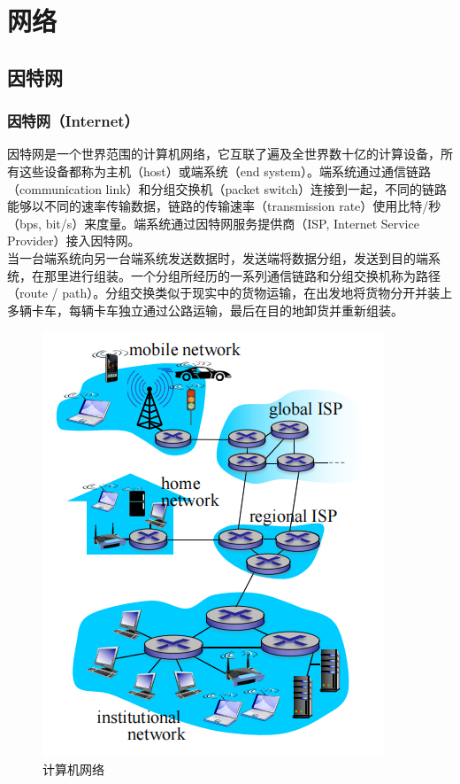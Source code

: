 \chapter{网络}

\section{因特网}

\subsection{因特网（Internet）}

因特网是一个世界范围的计算机网络，它互联了遍及全世界数十亿的计算设备，所有这些设备都称为主机（host）或端系统（end system）。端系统通过通信链路（communication link）和分组交换机（packet switch）连接到一起，不同的链路能够以不同的速率传输数据，链路的传输速率（transmission rate）使用比特/秒（bps, bit/s）来度量。端系统通过因特网服务提供商（ISP, Internet Service Provider）接入因特网。\\

当一台端系统向另一台端系统发送数据时，发送端将数据分组，发送到目的端系统，在那里进行组装。一个分组所经历的一系列通信链路和分组交换机称为路径（route / path）。分组交换类似于现实中的货物运输，在出发地将货物分开并装上多辆卡车，每辆卡车独立通过公路运输，最后在目的地卸货并重新组装。

\begin{figure}[H]
    \centering
    \includegraphics[scale=0.8]{img/C1/1-1/1.png}
    \caption{计算机网络}
\end{figure}

